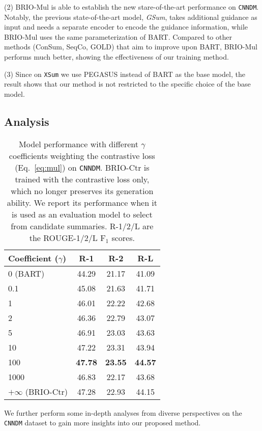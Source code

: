 \documentclass[11pt]{article}
\newcommand{\model}{BRIO\xspace}
\begin{document}
(2) \model-Mul is able to establish the new stare-of-the-art performance on \texttt{CNNDM}.
Notably, the previous state-of-the-art model, \textit{GSum}, takes additional guidance as input and needs a separate encoder to encode the guidance information, while \model-Mul uses the same parameterization of BART.
Compared to other methods (ConSum, SeqCo, GOLD) that aim to improve upon BART, \model-Mul performs much better, showing the effectiveness of our training method.

(3) Since on \texttt{XSum} we use PEGASUS instead of BART as the base model, the result shows that our method is not restricted to the specific choice of the base model.

\subsection{Analysis}
\label{subsec:analysis}

\begin{table}[t!]
\centering
\small
\begin{tabular}{lccc}
\toprule
\textbf{Coefficient ($\gamma$)} & \textbf{R-1} & \textbf{R-2} & \textbf{R-L}  \\
\midrule
 0 (BART) & 44.29 & 21.17 & 41.09 \\
 0.1 & 45.08  & 21.63  & 41.71  \\
 1 & 46.01 & 22.22 & 42.68  \\
 2 & 46.36 & 22.79 & 43.07 \\
 5 & 46.91 & 23.03 & 43.63 \\
 10 & 47.22 & 23.31 & 43.94 \\
 100 & \textbf{47.78} & \textbf{23.55} & \textbf{44.57} \\
 1000 & 46.83 & 22.17 & 43.68 \\
 $+\infty$ \small(\model-Ctr) & 47.28 & 22.93 & 44.15 \\
\bottomrule
\end{tabular}
\caption{\label{tab:coeff} Model performance with different $\gamma$ coefficients weighting the contrastive loss (Eq.~\ref{eq:mul}) on \texttt{CNNDM}. 
\model-Ctr is trained with the contrastive loss only, which no longer preserves its generation ability. 
We report its performance when it is used as an evaluation model to select from candidate summaries.
R-1/2/L are the ROUGE-1/2/L F$_1$ scores. }
\end{table}

We further perform some in-depth analyses from diverse perspectives on the \texttt{CNNDM} dataset to gain more insights into our proposed method.
\end{document}
